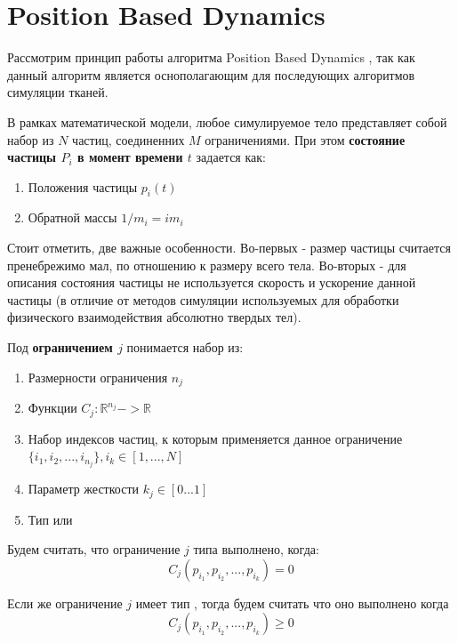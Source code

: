 \section{Position Based Dynamics} \label{ch2:pbd} %
	Рассмотрим принцип работы алгоритма Position Based Dynamics \cite{pbd}, так как данный алгоритм является оснополагающим для последующих алгоритмов симуляции тканей. 
	
	В рамках математической модели, любое симулируемое тело представляет собой набор из $N$ частиц, соединенних $M$ ограничениями. При этом \textbf{состояние частицы $P_i$ в момент времени $t$} задается как:
	\begin{enumerate}[1.]
		\item Положения частицы $p_i(t)$
		\item Обратной массы $1/m_i = im_i$
	\end{enumerate}
	
	Стоит отметить, две важные особенности. Во-первых - размер частицы считается пренебрежимо мал, по отношению к размеру всего тела. Во-вторых - для описания состояния частицы не используется скорость и ускорение данной частицы (в отличие от методов симуляции используемых для обработки физического взаимодействия абсолютно твердых тел).
	
	Под \textbf{ограничением $j$} понимается набор из:
	\begin{enumerate}[1.]
		\item Размерности ограничения $n_j$
		\item Функции $C_j: \mathbb{R}^{n_j}->\mathbb{R}$
		\item Набор индексов частиц, к которым применяется данное ограничение $\{i_1, i_2, ..., i_{n_j}\}, i_k \in [1, ..., N]$
		\item Параметр жесткости $k_j \in [0...1]$
		\item Тип  или 
	\end{enumerate}
	
	Будем считать, что ограничение $j$ типа  выполнено, когда:
	\begin{equation} \label{eq:constraint-eq}
		C_j(p_{i_1}, p_{i_2}, ..., p_{i_k}) = 0
	\end{equation} 
	
	Если же ограничение $j$ имеет тип , тогда будем считать что оно выполнено когда
	\begin{equation} \label{eq:constraint-neq}
		C_j(p_{i_1}, p_{i_2}, ..., p_{i_k}) \ge 0
	\end{equation} 
	
